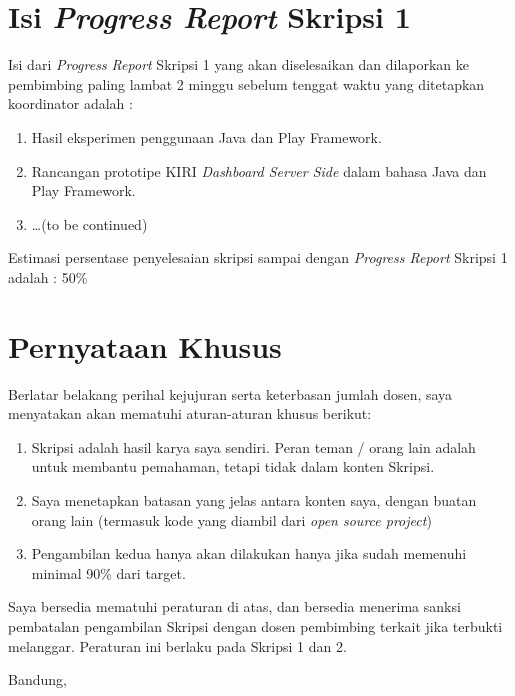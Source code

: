 \documentclass[a4paper,twoside]{article}
\begin{document}
\section{Isi {\it Progress Report} Skripsi 1}
Isi dari {\it Progress Report} Skripsi 1 yang akan diselesaikan dan dilaporkan ke pembimbing paling lambat 2 minggu sebelum tenggat waktu yang ditetapkan koordinator adalah :
\begin{enumerate}
	\item Hasil eksperimen penggunaan Java dan Play Framework.
	\item Rancangan prototipe KIRI \textit{Dashboard Server Side} dalam bahasa Java dan Play Framework.
	\item \ldots (to be continued)
\end{enumerate}
Estimasi persentase penyelesaian skripsi sampai dengan {\it Progress Report} Skripsi 1 adalah : 50\%

\section{Pernyataan Khusus}
Berlatar belakang perihal kejujuran serta keterbasan jumlah dosen, saya menyatakan akan mematuhi aturan-aturan khusus berikut:
\begin{enumerate}
	\item Skripsi adalah hasil karya saya sendiri. Peran teman / orang lain adalah untuk membantu pemahaman, tetapi tidak dalam konten Skripsi.
	\item Saya menetapkan batasan yang jelas antara konten saya, dengan buatan orang lain (termasuk kode yang diambil dari {\it open source project})
	\item Pengambilan kedua hanya akan dilakukan hanya jika sudah memenuhi minimal 90\% dari target.
\end{enumerate}
Saya bersedia mematuhi peraturan di atas, dan bersedia menerima sanksi pembatalan pengambilan Skripsi dengan dosen pembimbing terkait jika terbukti melanggar. Peraturan ini berlaku pada Skripsi 1 dan 2.

\vspace{1.5cm}

\centering Bandung, \tanggal\\
\vspace{2cm} \nama \\ 
\vspace{1cm}
\end{document}
